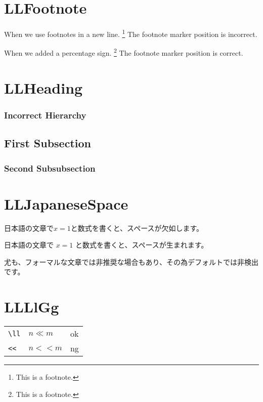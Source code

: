 \documentclass[a4paper]{article}
\newcommand{\tA}[1]{\textcolor{cA}{#1}}
\newcommand{\tD}[1]{\textcolor{cD}{#1}}
\begin{document}
\section{LLFootnote}

When we use footnotes in a new line.
\footnote{This is a footnote.}
The footnote marker position is incorrect.

When we added a percentage sign.%
\footnote{This is a footnote.}
The footnote marker position is correct.

\section{LLHeading}

\subsubsection{Incorrect Hierarchy}

\subsection{First Subsection}
\subsubsection{Second Subsubsection}

\section{LLJapaneseSpace}

\begin{CJK}{UTF8}{ipxm}
	日本語の文章で$x=1$と数式を書くと、スペースが欠如します。

	日本語の文章で $x=1$ と数式を書くと、スペースが生まれます。

	尤も、フォーマルな文章では非推奨な場合もあり、その為デフォルトでは非検出です。
\end{CJK}

\section{LLLlGg}

\begin{table}[H]
	\centering
	\begin{tabular}{lll}
		\verb|\ll| & $n\ll m$ & \tA{ok} \\
		\verb|<<|  & $n << m$ & \tD{ng} \\
	\end{tabular}
\end{table}
\end{document}
